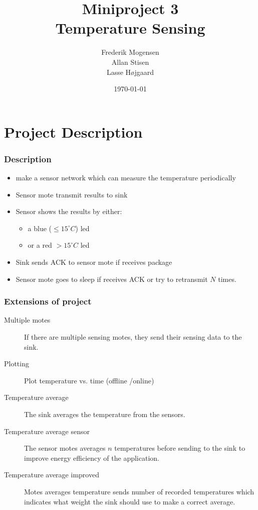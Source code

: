 \documentclass{beamer}
\title[Temperature Sensing]{Miniproject 3 \\ Temperature Sensing}
\author{Frederik Mogensen\\
    Allan Stisen \\
    Lasse Højgaard }
\date{\today}
\begin{document}
 \AtBeginSection[]
{
  \begin{frame}
    \tableofcontents[currentsection]
  \end{frame}
}
\begin{frame}
\titlepage
\end{frame}

\section{Project Description}


\begin{frame}
\frametitle{Description}

\begin{itemize}
	\item make a  sensor network which can measure the temperature periodically
	\item Sensor mote transmit results to sink
	\item Sensor shows the results by either:
	\begin{itemize}
		\item a blue ($\leq 15^{\circ} C $) led
		\item or a red $>15^{\circ} C$ led 
	\end{itemize}
	\item Sink sends ACK to sensor mote if receives package
	\item Sensor mote goes to sleep if receives ACK or try to retransmit $N$ times.
\end{itemize}
\end{frame}

\begin{frame}
\frametitle{Extensions of project}
\begin{description}
\item[Multiple motes] If there are multiple sensing motes, they send their sensing data to the sink.
\item[Plotting] Plot temperature vs. time (offline /online)
\item[Temperature average] The sink averages the temperature from the sensors.
\item[Temperature average sensor] The sensor motes averages $n$ temperatures before sending to the sink to improve energy efficiency of the application.
\item[Temperature average improved] Motes averages temperature sends number of recorded temperatures which indicates what weight the sink should use to make a correct average.

\end{description}
\end{frame}
\end{document}
